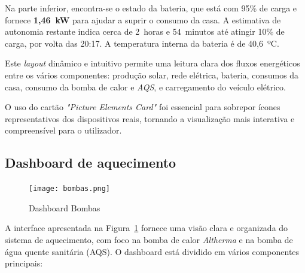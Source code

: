 Na parte inferior, encontra-se o estado da bateria, que está com 95\% de carga e fornece \textbf{1,46~kW} para ajudar a suprir o consumo da casa. A estimativa de autonomia restante indica cerca de 2~horas e 54~minutos até atingir 10\% de carga, por volta das 20:17. A temperatura interna da bateria é de 40{,}6~ºC.

Este \textit{layout} dinâmico e intuitivo permite uma leitura clara dos fluxos energéticos entre os vários componentes: produção solar, rede elétrica, bateria, consumos da casa, consumo da bomba de calor e \textit{AQS}, e carregamento do veículo elétrico.

O uso do cartão \textit{"Picture Elements Card"} foi essencial para sobrepor ícones representativos dos dispositivos reais, tornando a visualização mais interativa e compreensível para o utilizador.

\subsection{Dashboard de aquecimento}

\begin{figure}[H]
    \centering
    \texttt{[image: bombas.png]}
    \caption{Dashboard Bombas}
    \label{fig:bombas.png}
\end{figure}

A interface apresentada na Figura~\ref{fig:bombas.png} fornece uma visão clara e organizada do sistema de aquecimento, com foco na bomba de calor \textit{Altherma} e na bomba de água quente sanitária (AQS). O dashboard está dividido em vários componentes principais:

